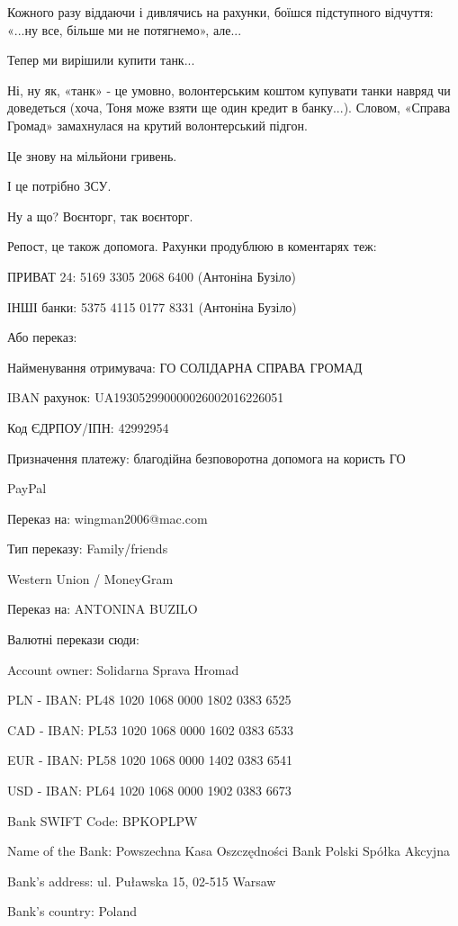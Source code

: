 Кожного разу віддаючи і дивлячись на рахунки, боїшся підступного відчуття: «...ну
все, більше ми не потягнемо», але...

Тепер ми вирішили купити танк...

Ні, ну як, «танк» - це умовно, волонтерським коштом купувати танки навряд чи
доведеться (хоча, Тоня може взяти ще один кредит в банку...). Словом, «Справа
Громад» замахнулася на крутий волонтерський підгон. 

Це знову на мільйони гривень. 

І це потрібно ЗСУ. 

Ну а що? Воєнторг, так воєнторг.

Репост, це також допомога. Рахунки продублюю в коментарях теж: 

ПРИВАТ 24: 5169 3305 2068 6400 (Антоніна Бузіло)

ІНШІ банки: 5375  4115 0177 8331 (Антоніна Бузіло)

Або переказ:

Найменування отримувача: ГО СОЛIДАРНА СПРАВА ГРОМАД 

IBAN рахунок: UA193052990000026002016226051

Код ЄДРПОУ/ІПН: 42992954

Призначення платежу: благодійна безповоротна допомога на користь ГО

PayPal

Переказ на: wingman2006@mac.com

Тип переказу: Family/friends

Western Union / MoneyGram

Переказ на: ANTONINA BUZILO

Валютні перекази сюди: 

Account owner: Solidarna Sprava Hromad

PLN - IBAN: PL48 1020 1068 0000 1802 0383 6525

CAD - IBAN: PL53 1020 1068 0000 1602 0383 6533

EUR - IBAN: PL58 1020 1068 0000 1402 0383 6541

USD - IBAN: PL64 1020 1068 0000 1902 0383 6673

Bank SWIFT Code:     BPKOPLPW 

Name of the Bank: Powszechna Kasa Oszczędności Bank Polski Spółka Akcyjna

Bank’s address: ul. Puławska 15, 02-515 Warsaw

Bank’s country: Poland
